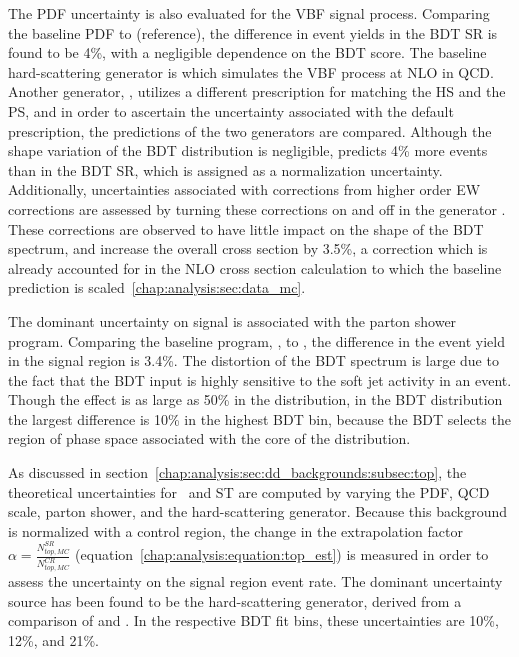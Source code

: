 The PDF uncertainty is also evaluated for the VBF signal process. 
Comparing the baseline PDF \ctten to \nnpdf (reference), the
difference in event yields in the BDT SR is found to be 4\%, with a
negligible dependence on the BDT score. The baseline hard-scattering
generator is \POWHEG which simulates the VBF process at NLO in
QCD. Another generator, \aMCATNLO, utilizes a different prescription
for matching the HS and the PS, and in order to ascertain the
uncertainty associated with the default prescription, the predictions
of the two generators are compared. Although the shape variation of
the BDT distribution is negligible, \aMCATNLO predicts 4\% more events
than \POWHEG in the BDT SR, which is assigned as a normalization
uncertainty. Additionally, uncertainties associated with corrections
from higher order EW corrections are assessed by turning these
corrections on and off in the generator \VBFNLO. These corrections are
observed to have little impact on the shape of the BDT spectrum, and
increase the overall cross section by 3.5\%, a correction which is
already accounted for in the NLO cross section calculation to which
the baseline prediction is scaled~\ref{chap:analysis:sec:data_mc}.

The dominant uncertainty on signal is associated with the parton
shower program. Comparing the baseline program, \PYTHIA, to \HERWIG,
the difference in the event yield in the signal region is 3.4\%. The
distortion of the BDT spectrum is large due to the fact that the BDT
input \pttot is highly sensitive to the soft
jet activity in an event. Though the effect is as large as 50\% in
the \pttot distribution, in the BDT distribution the largest
difference is 10\% in the highest BDT bin, because the BDT selects the
region of phase space associated with the core of the \pttot
distribution. 

As discussed in
section~\ref{chap:analysis:sec:dd_backgrounds:subsec:top}, the
theoretical uncertainties
for \ttbar~and ST are computed by varying the PDF, QCD scale, parton
shower, and the hard-scattering generator. Because this background is
normalized with a control region, the change in the extrapolation
factor $\alpha = \frac{N_{top,MC}^{SR}}{N_{top,MC}^{CR}}$
(equation~\ref{chap:analysis:equation:top_est}) is measured in order to
assess the uncertainty on the signal region event rate. The dominant
uncertainty source has been found to be the hard-scattering generator,
derived from a comparison of \MCATNLO and \ALPGEN. In the respective
BDT fit bins, these uncertainties are 10\%, 12\%, and 21\%.

